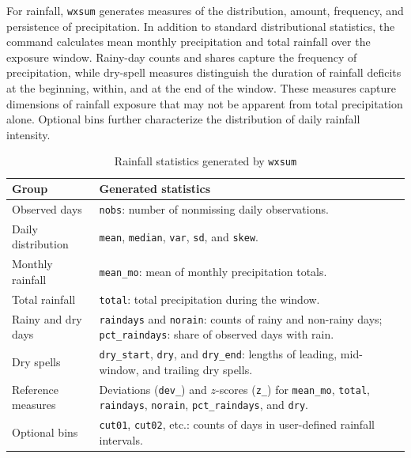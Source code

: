 For rainfall, \texttt{wxsum} generates measures of the distribution, amount, frequency, and persistence of precipitation. In addition to standard distributional statistics, the command calculates mean monthly precipitation and total rainfall over the exposure window. Rainy-day counts and shares capture the frequency of precipitation, while dry-spell measures distinguish the duration of rainfall deficits at the beginning, within, and at the end of the window. These measures capture dimensions of rainfall exposure that may not be apparent from total precipitation alone. Optional bins further characterize the distribution of daily rainfall intensity.

\begin{table}[htbp]
    \caption{Rainfall statistics generated by \texttt{wxsum}}
    \label{tab:rainout}
    \begin{center}
        \begin{tabularx}{\textwidth}{>{\raggedright\arraybackslash}p{}>{\raggedright\arraybackslash}X}
            \hline
            Group & Generated statistics \\
            \hline
            Observed days & \texttt{nobs}: number of nonmissing daily observations. \\
            Daily distribution & \texttt{mean}, \texttt{median}, \texttt{var}, \texttt{sd}, and \texttt{skew}. \\
            Monthly rainfall & \texttt{mean\_mo}: mean of monthly precipitation totals. \\
            Total rainfall & \texttt{total}: total precipitation during the window. \\
            Rainy and dry days & \texttt{raindays} and \texttt{norain}: counts of rainy and non-rainy days; \texttt{pct\_raindays}: share of observed days with rain. \\
            Dry spells & \texttt{dry\_start}, \texttt{dry}, and \texttt{dry\_end}: lengths of leading, mid-window, and trailing dry spells. \\
            Reference measures & Deviations (\texttt{dev\_}) and $z$-scores (\texttt{z\_}) for \texttt{mean\_mo}, \texttt{total}, \texttt{raindays}, \texttt{norain}, \texttt{pct\_raindays}, and \texttt{dry}. \\
            Optional bins & \texttt{cut01}, \texttt{cut02}, etc.: counts of days in user-defined rainfall intervals. \\
            \hline
        \end{tabularx}
    \end{center}
\end{table}

